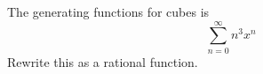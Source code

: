 The generating functions for cubes is
\[
\sum_{n=0}^\infty n^3 x^n
\]
Rewrite this as a rational function.
